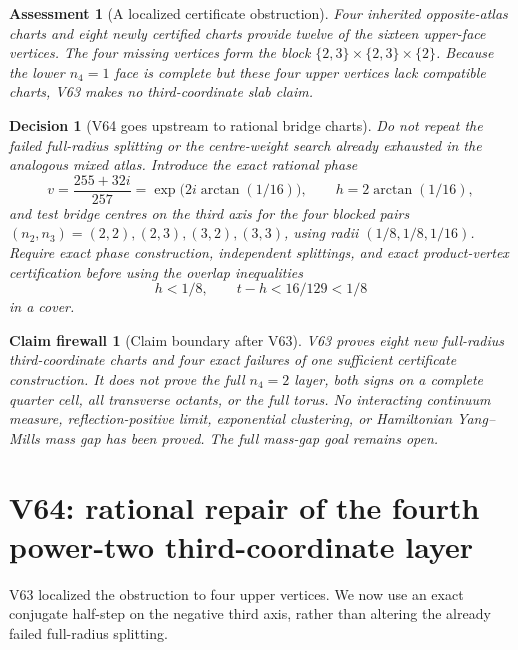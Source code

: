\documentclass[11pt,oneside]{article}
\newtheorem{assessment}[theorem]{Assessment}
\newtheorem{firewall}[theorem]{Claim firewall}
\newtheorem{decision}[theorem]{Decision}
\theoremstyle{definition}
\theoremstyle{remark}
\begin{document}
\begin{assessment}[A localized certificate obstruction]
\label{ass:newv63}
Four inherited opposite-atlas charts and eight newly certified
charts provide twelve of the sixteen upper-face vertices.  The
four missing vertices form the block
\(\{2,3\}\times\{2,3\}\times\{2\}\).  Because the lower
\(n_4=1\) face is complete but these four upper vertices lack
compatible charts, V63 makes no third-coordinate slab claim.
\end{assessment}

\begin{decision}[V64 goes upstream to rational bridge charts]
\label{dec:newv63-next}
Do not repeat the failed full-radius splitting or the centre-weight
search already exhausted in the analogous mixed atlas.  Introduce
the exact rational phase
\[
 v=\frac{255+32i}{257}
   =\exp\!\bigl(2i\arctan(1/16)\bigr),\qquad
 h=2\arctan(1/16),                                   \tag{63.12}
\]
and test bridge centres on the third axis for the four blocked
pairs \((n_2,n_3)=(2,2),(2,3),(3,2),(3,3)\), using radii
\((1/8,1/8,1/16)\).  Require exact phase construction, independent
splittings, and exact product-vertex certification before using
the overlap inequalities
\[
 h<1/8,\qquad t-h<16/129<1/8                         \tag{63.13}
\]
in a cover.
\end{decision}

\begin{firewall}[Claim boundary after V63]
\label{fire:newv63-final}
V63 proves eight new full-radius third-coordinate charts and four
exact failures of one sufficient certificate construction.  It
does not prove the full \(n_4=2\) layer, both signs on a complete
quarter cell, all transverse octants, or the full torus.  No
interacting continuum measure, reflection-positive limit,
exponential clustering, or Hamiltonian Yang--Mills mass gap has
been proved.  The full mass-gap goal remains open.
\end{firewall}

\section{V64: rational repair of the fourth power-two third-coordinate layer}
\label{sec:newv64-fourth-rational-bridge}

V63 localized the obstruction to four upper vertices.  We now use
an exact conjugate half-step on the negative third axis, rather than
altering the already failed full-radius splitting.
\end{document}
